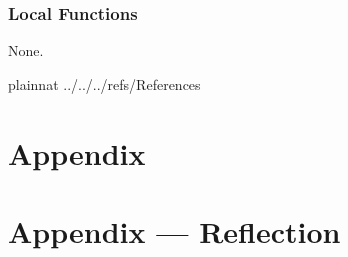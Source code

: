 \documentclass[12pt, titlepage]{article}
\begin{document}
\subsubsection{Local Functions}

None.

\newpage

 {plainnat}
 {../../../refs/References}

\newpage

\section{Appendix} \label{Appendix}


\newpage{}

\section*{Appendix --- Reflection}


\end{document}
